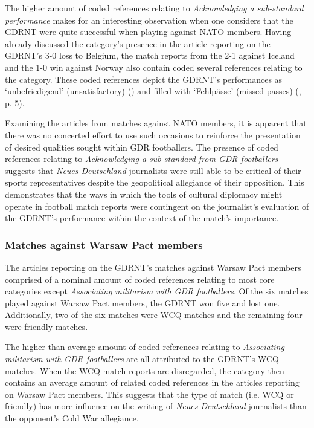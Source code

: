 The higher amount of coded references relating to \textit{Acknowledging a sub-standard performance} makes for an interesting observation when one considers that the GDRNT were quite successful when playing against NATO members. Having already discussed the category’s presence in the article reporting on the GDRNT’s 3-0 loss to Belgium, the match reports from the 2-1 against Iceland and the 1-0 win against Norway also contain coded several references relating to the category. These coded references depict the GDRNT’s performances as ‘unbefriedigend’ (unsatisfactory) (\cite{nd19740524}) and filled with ‘Fehlpässe’ (missed passes) (\cite{nd19730719}, p. 5).

Examining the articles from matches against NATO members, it is apparent that there was no concerted effort to use such occasions to reinforce the presentation of desired qualities sought within GDR footballers. The presence of coded references relating to \textit{Acknowledging a sub-standard from GDR footballers} suggests that \textit{Neues Deutschland} journalists were still able to be critical of their sports representatives despite the geopolitical allegiance of their opposition. This demonstrates that the ways in which the tools of cultural diplomacy might operate in football match reports were contingent on the journalist’s evaluation of the GDRNT’s performance within the context of the match’s importance.

\subsubsection*{Matches against Warsaw Pact members}

The articles reporting on the GDRNT’s matches against Warsaw Pact members comprised of a nominal amount of coded references relating to most core categories except \textit{Associating militarism with GDR footballers}. Of the six matches played against Warsaw Pact members, the GDRNT won five and lost one. Additionally, two of the six matches were WCQ matches and the remaining four were friendly matches.

The higher than average amount of coded references relating to \textit{Associating militarism with GDR footballers} are all attributed to the GDRNT’s WCQ matches. When the WCQ match reports are disregarded, the category then contains an average amount of related coded references in the articles reporting on Warsaw Pact members. This suggests that the type of match (i.e. WCQ or friendly) has more influence on the writing of \textit{Neues Deutschland} journalists than the opponent’s Cold War allegiance.

